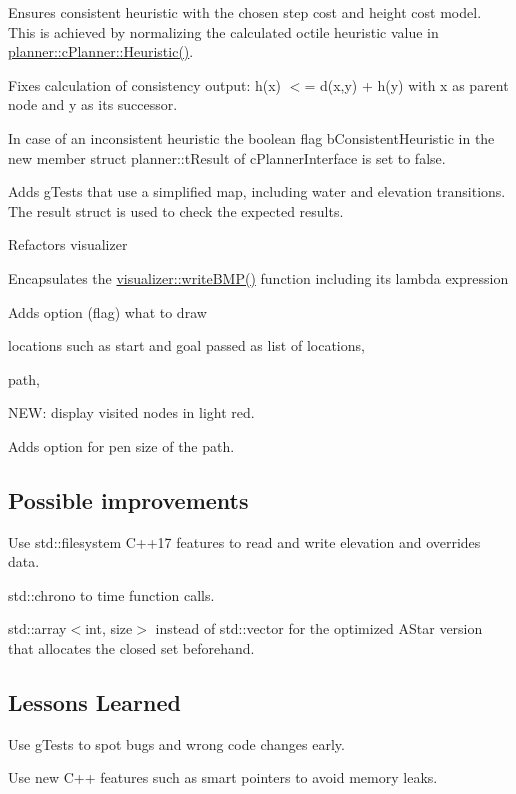 \begin{DoxyItemize}
\item Ensures consistent heuristic with the chosen step cost and height cost model. This is achieved by normalizing the calculated octile heuristic value in \mbox{\hyperlink{classplanner_1_1c_planner_a77cefeae3d7a58a96c74b66f6be22611}{planner\+::c\+Planner\+::\+Heuristic()}}.
\item Fixes calculation of consistency output\+: h(x) $<$= d(x,y) + h(y) with x as parent node and y as its successor.
\item In case of an inconsistent heuristic the boolean flag b\+Consistent\+Heuristic in the new member struct planner\+::t\+Result of c\+Planner\+Interface is set to false.
\item Adds g\+Tests that use a simplified map, including water and elevation transitions. The result struct is used to check the expected results.
\item Refactors visualizer
\begin{DoxyItemize}
\item Encapsulates the \mbox{\hyperlink{namespacevisualizer_ab4e649cd7413a51ac1ae4b31a2994c3a}{visualizer\+::write\+B\+M\+P()}} function including its lambda expression
\item Adds option (flag) what to draw
\begin{DoxyItemize}
\item locations such as start and goal passed as list of locations,
\item path,
\item N\+EW\+: display visited nodes in light red.
\end{DoxyItemize}
\item Adds option for pen size of the path.
\end{DoxyItemize}
\end{DoxyItemize}

\subsection*{Possible improvements}


\begin{DoxyItemize}
\item Use std\+::filesystem C++17 features to read and write elevation and overrides data.
\item std\+::chrono to time function calls.
\item std\+::array$<$int, size$>$ instead of std\+::vector for the optimized A\+Star version that allocates the closed set beforehand.
\end{DoxyItemize}

\subsection*{Lessons Learned}


\begin{DoxyItemize}
\item Use g\+Tests to spot bugs and wrong code changes early.
\item Use new C++ features such as smart pointers to avoid memory leaks. 
\end{DoxyItemize}